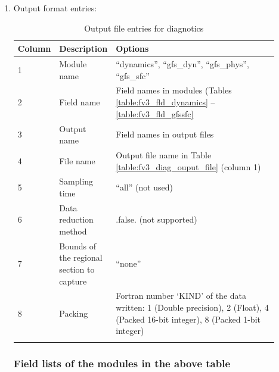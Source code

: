 \documentclass[11pt,fleqn]{report}              %
\begin{document}
\begin{enumerate}
\item Output format entries:
{
\fontsize{9}{11}\selectfont
\begin{longtable}{p{0.06\linewidth} | p{0.2\linewidth} | p{0.65\linewidth} }
\hline
\hline
Column & Description & Options \\
\hline
1 & Module name & ``dynamics'', ``gfs\_dyn'', ``gfs\_phys'', ``gfs\_sfc'' \\
2 & Field name & Field names in modules (Tables \ref{table:fv3_fld_dynamics} -- \ref{table:fv3_fld_gfssfc} \\
3 & Output name & Field names in output files \\
4 & File name & Output file name in Table \ref{table:fv3_diag_ouput_file} (column 1) \\
5 & Sampling time & ``all''  (not used) \\
6 & Data reduction method & .false. (not supported)  \\
7 & Bounds of the regional section to capture & ``none'' \\ 
8 & Packing & Fortran number `KIND' of the data written: 1 (Double precision), 2 (Float), 4 (Packed 16-bit integer), 8 (Packed 1-bit integer)  \\
\hline
\caption{Output file entries for diagnotics}
\label{table:fv3_diag_ouput_field}
\end{longtable}
}

\subsubsection{Field lists of the modules in the above table}

\begin{enumerate}


\end{enumerate}
\end{enumerate}
\end{document}
